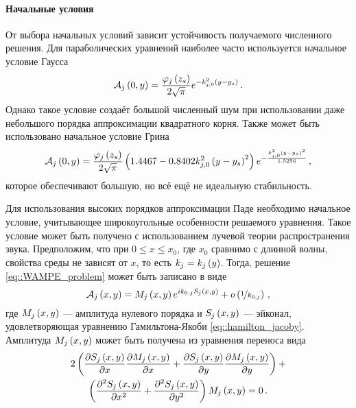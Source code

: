 \documentclass[../document.tex]{subfiles}
\begin{document}
            \paragraph{Начальные условия}
                \par От выбора начальных условий зависит устойчивость получаемого численного решения. Для параболических уравнений наиболее часто используется начальное условие Гаусса \cite{jensen}
                \begin{equation}
                    \mathcal{A}_j\left(0,y\right)=\frac{\varphi_j\left(z_s\right)}{2\sqrt{\pi}}e^{-k_{j,0}^2\left(y-y_s\right)}\,.
                \end{equation}
                Однако такое условие создаёт большой численный шум при использовании даже небольшого порядка аппроксимации квадратного корня. Также может быть использовано начальное условие Грина
                \begin{equation}
                    \mathcal{A}_j\left(0,y\right)=\frac{\varphi_j\left(z_s\right)}{2\sqrt{\pi}}\left(1.4467-0.8402k_{j,0}^2\left(y-y_s\right)^2\right)e^{-\frac{k_{j,0}^2\left(y-y_s\right)^2}{1.5256}}\,,
                \end{equation}
                которое обеспечивают большую, но всё ещё не идеальную стабильность. 
                \par Для использования высоких порядков аппроксимации Паде необходимо начальное условие, учитывающее широкоугольные особенности решаемого уравнения. Такое условие может быть получено с использованием лучевой теории распространения звука. Предположим, что при $0\leqslant x\leqslant x_0$, где $x_0$ сравнимо с длинной волны, свойства среды не зависят от $x$, то есть $k_j=k_j\left(y\right)$. Тогда, решение \eqref{eq::WAMPE_problem} может быть записано в виде
                \begin{equation}
                    \mathcal{A}_j\left(x,y\right)=M_j\left(x,y\right)e^{ik_{0,j}S_j\left(x,y\right)}+o\left(\nicefrac{1}{k_{0,j}}\right)\,,
                \end{equation}
                где $M_j\left(x,y\right)$ --- амплитуда нулевого порядка и
                $S_j\left(x,y\right)$ --- эйконал, удовлетворяющая уравнению Гамильтона-Якоби \eqref{eq::hamilton_jacoby}. Амплитуда $M_j\left(x,y\right)$ может быть получена из уравнения переноса вида
                \begin{multline}
                    2\left(\frac{\partial S_j\left(x,y\right)}{\partial x}\frac{\partial M_j\left(x,y\right)}{\partial x}+\frac{\partial S_j\left(x,y\right)}{\partial y}\frac{\partial M_j\left(x,y\right)}{\partial y}\right)+\\\left(\frac{\partial^2S_j\left(x,y\right)}{\partial x^2}+\frac{\partial^2S_j\left(x,y\right)}{\partial y^2}\right)M_j\left(x,y\right)=0\,.
                \end{multline}
\end{document}
